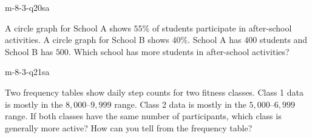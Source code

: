 \begin{practiceQuestion}{m-8-3-q20}{sa}
\begin{questionText}
A circle graph for School A shows $55\%$ of students participate in after-school activities. A circle graph for School B shows $40\%$. School A has $400$ students and School B has $500$. Which school has more students in after-school activities?
\end{questionText}
\end{practiceQuestion}

\begin{practiceQuestion}{m-8-3-q21}{sa}
\begin{questionText}
Two frequency tables show daily step counts for two fitness classes. Class 1 data is mostly in the $8{,}000$--$9{,}999$ range. Class 2 data is mostly in the $5{,}000$--$6{,}999$ range. If both classes have the same number of participants, which class is generally more active? How can you tell from the frequency table?
\end{questionText}
\end{practiceQuestion}


